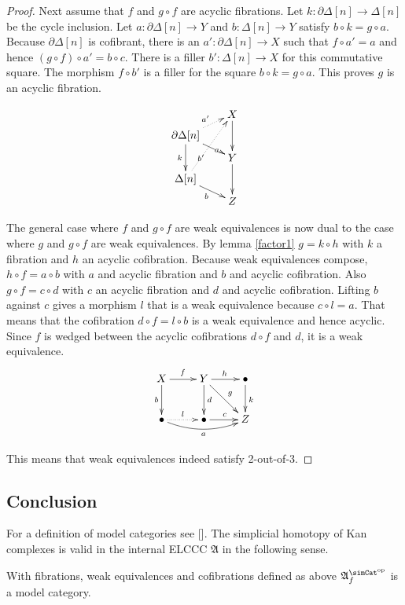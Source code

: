 \documentclass{tac}
\newcommand\dual{^{\mathrm{op}}}
\newcommand\s{^{\simCat\dual}}
\newcommand\of{:}
\newcommand\simplex\Delta
\newcommand\cycle{\partial\Delta}
\newcommand\f{_f}
\newcommand\ambient{\mathfrak A}
\begin{document}
\begin{proof}
Next assume that $f$ and $g\circ f$ are acyclic fibrations. Let $k\of\cycle[n]\to\simplex[n]$ be the cycle inclusion. Let $a\of\cycle[n]\to Y$ and $b\of\simplex[n]\to Y$ satisfy $b\circ k = g \circ a$. Because $\cycle[n]$ is cofibrant, there is an $a'\of \cycle[n]\to X$ such that $f\circ a' = a$ and hence $(g\circ f)\circ a' = b\circ c$. There is a filler $b'\of\simplex[n]\to X$ for this commutative square. The morphism $f\circ b'$ is a filler for the square $b\circ k = g \circ a$. This proves $g$ is an acyclic fibration.

\[\xy
(14\halfrootthree,28)*+{X}="x", (0,21)*+{\cycle[n]}="v", (14\halfrootthree,14)*+{Y}="y", (0,7)*+{\simplex[n]}="w", (14\halfrootthree,0)*+{Z}="z"
\ar@{.>}^{a'} "v";"x" \ar|(.67)a "v";"y" \ar_k "v";"w"
\ar@{.>}|(.33){b'} "w";"x" \ar_b "w";"z"
\ar "x";"y" \ar "y";"z"
\endxy\]

The general case where $f$ and $g\circ f$ are weak equivalences is now dual to the case where $g$ and $g\circ f$ are weak equivalences. By lemma \ref{factor1} $g=k\circ h$ with $k$ a fibration and $h$ an acyclic cofibration. Because weak equivalences compose, $h\circ f = a\circ b$ with $a$ and acyclic fibration and $b$ and acyclic cofibration. 
Also $g\circ f = c\circ d$ with $c$ an acyclic fibration and $d$ and acyclic cofibration. 
Lifting $b$ against $c$ gives a morphism $l$ that is a weak equivalence because $c\circ l = a$. That means that the cofibration $d\circ f = l\circ b$ is a weak equivalence and hence acyclic. Since $f$ is wedged between the acyclic cofibrations $d\circ f$ and $d$, it is a weak equivalence. 
\[\xymatrix{
X\ar[r]^f\ar[d]_b & Y\ar[r]^h\ar[d]^d\ar[dr]^g & \bullet\ar[d]^k\\
\bullet\ar@/_2ex/[rr]_a\ar@{.>}[r]^l & \bullet\ar[r]^c & Z
}\]

This means that weak equivalences indeed satisfy 2-out-of-3.
\end{proof}


\subsection{Conclusion}
For a definition of model categories see [\cite{Hovey99, GJSHT}]. The simplicial homotopy of Kan complexes is valid in the internal ELCCC $\ambient$ in the following sense.

\begin{theorem}
With fibrations, weak equivalences and cofibrations defined as above $\ambient\s\f$ is a model category.
\label{model category}
\end{theorem}
\end{document}
